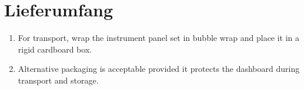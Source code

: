 \chapter{Lieferumfang}\label{ch:package}

\begin{enumerate}
    \item For transport, wrap the instrument panel set in bubble wrap and place it in a rigid cardboard box.
    \item Alternative packaging is acceptable provided it protects the dashboard during transport and storage.
\end{enumerate}
